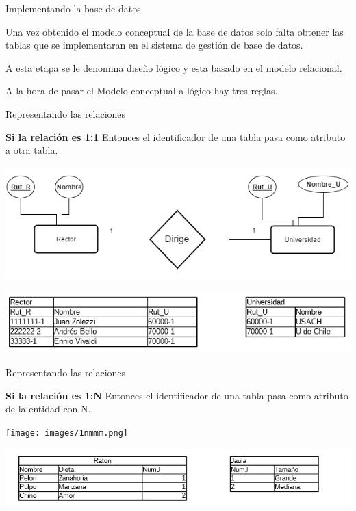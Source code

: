 \documentclass[11pt]{beamer}
\begin{document}
\begin{frame}{Implementando la base de datos}

Una vez obtenido el modelo conceptual de la base de datos solo falta obtener las tablas que se implementaran en el sistema de gestión de base de datos. 

A esta etapa se le denomina diseño lógico y esta basado en el modelo relacional.

A la hora de pasar el Modelo conceptual a lógico hay tres reglas.
\end{frame}


\begin{frame}{Representando las relaciones}



 \textbf{Si la relación es 1:1} Entonces el identificador de una tabla pasa como atributo a otra tabla.

\begin{center}
\includegraphics[scale=.5]{images/11mr.png} 
\end{center}
\begin{center}
\includegraphics[scale=0.7]{images/11mrt.png} 
\end{center}
\end{frame}



\begin{frame}{Representando las relaciones}


 \textbf{Si la relación es 1:N} Entonces el identificador de una tabla pasa como atributo de la entidad con N.

\begin{center}
\texttt{[image: images/1nmmm.png]} 
\end{center}
\begin{center}
\includegraphics[scale=.7]{images/1Nmrt.png} 
\end{center}
\end{frame}
\end{document}
